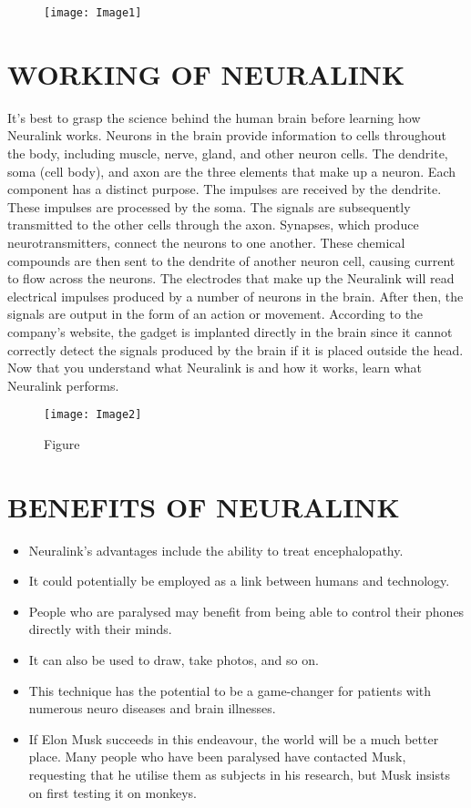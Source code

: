 \documentclass[12pt]{article}
\begin{document}
\begin{figure}
\centering
\texttt{[image: Image1]}
\caption{}
\end{figure}
\clearpage

\section*{WORKING OF NEURALINK}

It's best to grasp the science behind the human brain before learning how Neuralink works. Neurons in the brain provide information to cells throughout the body, including muscle, nerve, gland, and other neuron cells. The dendrite, soma (cell body), and axon are the three elements that make up a neuron. Each component has a distinct purpose. The impulses are received by the dendrite. These impulses are processed by the soma. The signals are subsequently transmitted to the other cells through the axon. Synapses, which produce neurotransmitters, connect the neurons to one another. These chemical compounds are then sent to the dendrite of another neuron cell, causing current to flow across the neurons. The electrodes that make up the Neuralink will read electrical impulses produced by a number of neurons in the brain. After then, the signals are output in the form of an action or movement. According to the company's website, the gadget is implanted directly in the brain since it cannot correctly detect the signals produced by the brain if it is placed outside the head. Now that you understand what Neuralink is and how it works, learn what Neuralink performs.

\begin{figure}
\centering
\texttt{[image: Image2]}
\caption{Figure}
\end{figure}


\clearpage

\section*{BENEFITS OF NEURALINK}
\begin{itemize}

\item Neuralink's advantages include the ability to treat encephalopathy.
\item It could potentially be employed as a link between humans and technology.
\item	People who are paralysed may benefit from being able to control their phones directly with their minds.
\item	It can also be used to draw, take photos, and so on.
\item	This technique has the potential to be a game-changer for patients with numerous neuro diseases and brain illnesses.
\item	If Elon Musk succeeds in this endeavour, the world will be a much better place. Many people who have been paralysed have contacted Musk, requesting that he utilise them as subjects in his research, but Musk insists on first testing it on monkeys.
\end{itemize}
\end{document}
